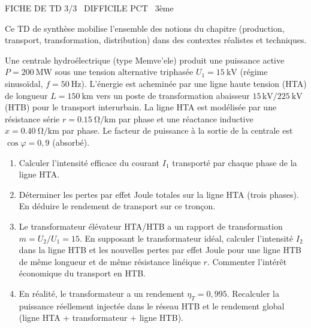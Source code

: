 \documentclass[11pt]{article}
\begin{document}
\begin{tcolorbox}[enhanced,colback=popink,colframe=popink,arc=10pt,boxrule=0pt,left=12pt,right=12pt,top=9pt,bottom=9pt]
{\color{white}\popxbold\small FICHE DE TD 3/3 \textbullet\ DIFFICILE \hfill PCT \textbullet\ 3ème\par}
\end{tcolorbox}
\vspace{4pt}
Ce TD de synthèse mobilise l'ensemble des notions du chapitre (production, transport, transformation, distribution) dans des contextes réalistes et techniques.

\begin{exercice}
Une centrale hydroélectrique (type Memve'ele) produit une puissance active $P = \SI{200}{\mega\watt}$ sous une tension alternative triphasée $U_1 = \SI{15}{\kilo\volt}$ (régime sinusoïdal, $f = \SI{50}{\hertz}$). L'énergie est acheminée par une ligne haute tension (HTA) de longueur $L = \SI{150}{\kilo\metre}$ vers un poste de transformation abaisseur $15\,\text{kV} / \SI{225}{\kilo\volt}$ (HTB) pour le transport interurbain. La ligne HTA est modélisée par une résistance série $r = \SI{0,15}{\ohm\per\kilo\metre}$ par phase et une réactance inductive $x = \SI{0,40}{\ohm\per\kilo\metre}$ par phase. Le facteur de puissance à la sortie de la centrale est $\cos\varphi = 0,9$ (absorbé).
\begin{enumerate}
    \item Calculer l'intensité efficace du courant $I_1$ transporté par chaque phase de la ligne HTA.
    \item Déterminer les pertes par effet Joule totales sur la ligne HTA (trois phases). En déduire le rendement de transport sur ce tronçon.
    \item Le transformateur élévateur HTA/HTB a un rapport de transformation $m = U_2/U_1 = 15$. En supposant le transformateur idéal, calculer l'intensité $I_2$ dans la ligne HTB et les nouvelles pertes par effet Joule pour une ligne HTB de même longueur et de même résistance linéique $r$. Commenter l'intérêt économique du transport en HTB.
    \item En réalité, le transformateur a un rendement $\eta_T = 0,995$. Recalculer la puissance réellement injectée dans le réseau HTB et le rendement global (ligne HTA + transformateur + ligne HTB).
\end{enumerate}
\end{exercice}
\end{document}
